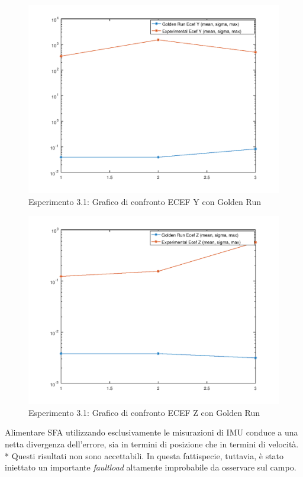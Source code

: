\begin{figure}[h]
	\centering
	\includegraphics[width=0.7\linewidth]{img/exp11ecefY}
	\caption{Esperimento 3.1: Grafico di confronto ECEF Y con Golden Run}
\end{figure}
\begin{figure}[h]
	\centering
	\includegraphics[width=0.7\linewidth]{img/exp11ecefZ}
	\caption{Esperimento 3.1: Grafico di confronto ECEF Z con Golden Run}
\end{figure}
\FloatBarrier
Alimentare SFA utilizzando esclusivamente le misurazioni di IMU conduce a una netta divergenza dell'errore, sia in termini di posizione che in termini di velocit\`a.\\*
Questi risultati non sono accettabili. In questa fattispecie, tuttavia, \`e stato iniettato un importante \emph{faultload} altamente improbabile da osservare sul campo.
